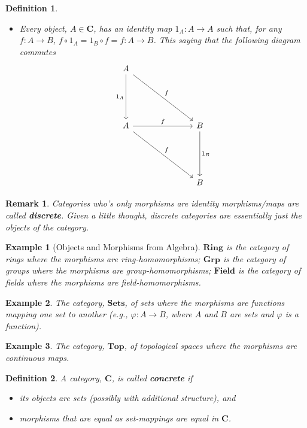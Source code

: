 \documentclass[12pt,reqno]{amsart}
\theoremstyle{plain}
\newtheorem{defi}{Definition}
\newtheorem{rem}{Remark}
\newtheorem{ex}{Example}
\newcommand{\cat}{\mathbf{C}}
\newcommand{\ca}{\mathbf}
\begin{document}
\begin{defi}
\begin{itemize}
\[\]
\item[\textup{(iiii)}] Every object, $A \in \cat$, has an identity map $1_A \colon A \to A$ such that, for any $f \colon A \to B$, $f \circ 1_A = 1_B \circ f = f \colon A \to B$. This saying that the following diagram commutes
\[
\begin{tikzcd}
A \arrow[ddd, "1_A"'] \arrow[rrrddd, "f"] &  &  &                    \\
                                        &  &  &                    \\
                                        &  &  &                    \\
A \arrow[rrrddd, "f"] \arrow[rrr, "f"]  &  &  & B \arrow[ddd, "1_B"] \\
                                        &  &  &                    \\
                                        &  &  &                    \\
                                        &  &  & B                 
\end{tikzcd}
\]
\end{itemize}
\end{defi} 
\begin{rem} Categories who's only morphisms are identity morphisms/maps are called \textbf{discrete}. Given a little thought, discrete categories are essentially just the objects of the category. 
\end{rem} 
\begin{ex}[Objects and Morphisms from Algebra] $\ca {Ring}$ is the category of rings where the morphisms are ring-homomorphisms; $\ca {Grp}$ is the category of groups where the morphisms are group-homomorphisms; $\ca {Field}$ is the category of fields where the morphisms are field-homomorphisms. 
\end{ex} 
\begin{ex} The category, $\ca {Sets}$, of sets where the morphisms are functions mapping one set to another (e.g., $\varphi \colon A \to B$, where $A$ and $B$ are sets and $\varphi$ is a function).
\end{ex}
\begin{ex} The category, $\ca{Top}$, of topological spaces where the morphisms are continuous maps. 
\end{ex} 
\begin{defi} A category, $\cat$, is called \textbf{concrete} if 
\begin{itemize}
\item[\textup{(i)}] its objects are sets (possibly with additional structure), and
\item[\textup{(ii)}] morphisms that are equal as set-mappings are equal in $\cat$. 
\end{itemize}
\end{defi} 
\end{document}
